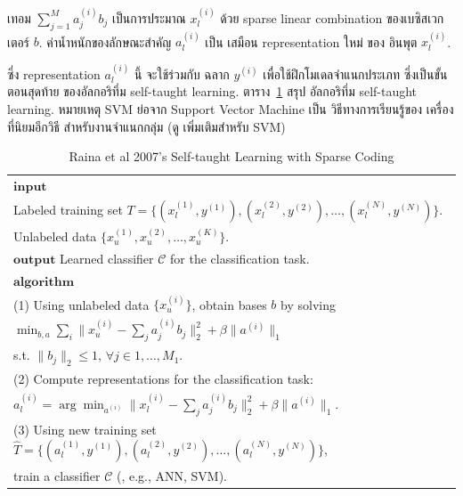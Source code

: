เทอม $\sum_{j=1}^M a_j^{(i)} b_j$ เป็นการประมาณ $x_l^{(i)}$ ด้วย sparse linear combination ของเบซิสเวกเตอร์ $b$.
ค่าน้ำหนักของลักษณะสำคัญ $a_l^{(i)}$ เป็น เสมือน representation ใหม่ ของ อินพุต $x_l^{(i)}$.

ซึ่ง representation $a_l^{(i)}$ นี้ จะใช้ร่วมกับ ฉลาก $y^{(i)}$ เพื่อใช้ฝึกโมเดลจำแนกประเภท ซึ่งเป็นขั้นตอนสุดท้าย ของอัลกอริทึ่ม self-taught learning.
ตาราง~\ref{tbl: deep self-taught learning} สรุป อัลกอริทึ่ม self-taught learning.
หมายเหตุ SVM ย่อจาก Support Vector Machine เป็น วิธีทางการเรียนรู้ของ
เครื่องที่นิยมอีกวิธี สำหรับงานจำแนกกลุ่ม (ดู \cite{Burges1998A, CortesVapnik1995a, SchoelkopfEtAl1999a, ChangEtAl2011a} เพิ่มเติมสำหรับ SVM)

%
\begin{table}[hbtp]
\caption{Raina et al 2007's Self-taught Learning with Sparse Coding}
\begin{center}
\begin{tabular}{|l|}
\hline
$\mathbf{input}$ \\
\quad Labeled training set $T = \{ (x_l^{(1)}, y^{(1)}), (x_l^{(2)}, y^{(2)}), \ldots, (x_l^{(N)}, y^{(N)})\}$. \\
\quad Unlabeled data $\{ x_u^{(1)}, x_u^{(2)}, \ldots, x_u^{(K)} \}$. \\
$\mathbf{output}$ Learned classifier $\mathcal{C}$ for the classification task. \\
$\mathbf{algorithm}$ \\

\quad (1) Using unlabeled data $\{ x_u^{(i)} \}$, obtain bases $b$ by solving\\
\quad \quad \quad $ \min_{b,a} \sum_i \| x_u^{(i)} - \sum_j a_j^{(i)} b_j \|_2^2 + \beta \| a^{(i)} \|_1$ \\
\quad \quad \quad s.t. $\| b_j \|_2  \leq 1$, $\forall j \in 1, \ldots, M_1$. \\

\quad (2) Compute representations for the classification task: \\
\quad \quad \quad $ a_l^{(i)} = \arg \min_{a^{(i)}} \| x_l^{(i)} - \sum_j a_j^{(i)} b_j \|_2^2 + \beta \| a^{(i)} \|_1$. \\

\quad (3) Using new training set $\hat{T} = \{ (a_l^{(1)}, y^{(1)}), (a_l^{(2)}, y^{(2)}), \ldots, (a_l^{(N)}, y^{(N)})\}$, \\
train a classifier $\mathcal{C}$ (, e.g., ANN, SVM). \\

\hline
\end{tabular} 
\end{center}
\label{tbl: deep self-taught learning}
\end{table}

